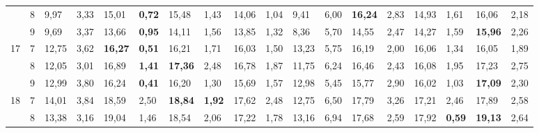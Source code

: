 \documentclass[conference]{IEEEtran}
\begin{document}
\begin{table*}[]
\begin{tabular}{|cl|ll|ll|ll|ll|ll|ll|ll|ll|}
		\multicolumn{1}{|c|}{} & 8 & \multicolumn{1}{l|}{9,97} & 3,33 & \multicolumn{1}{l|}{15,01} & \textbf{0,72} & \multicolumn{1}{l|}{15,48} & 1,43 & \multicolumn{1}{l|}{14,06} & 1,04 & \multicolumn{1}{l|}{9,41} & 6,00 & \multicolumn{1}{l|}{\textbf{16,24}} & 2,83 & \multicolumn{1}{l|}{14,93} & 1,61 & \multicolumn{1}{l|}{16,06} & 2,18 \\ \cline{2-18} 
		\multicolumn{1}{|c|}{} & 9 & \multicolumn{1}{l|}{9,69} & 3,37 & \multicolumn{1}{l|}{13,66} & \textbf{0,95} & \multicolumn{1}{l|}{14,11} & 1,56 & \multicolumn{1}{l|}{13,85} & 1,32 & \multicolumn{1}{l|}{8,36} & 5,70 & \multicolumn{1}{l|}{14,55} & 2,47 & \multicolumn{1}{l|}{14,27} & 1,59 & \multicolumn{1}{l|}{\textbf{15,96}} & 2,26 \\ \hline
		\multicolumn{1}{|c|}{\multirow{3}{*}{17}} & 7 & \multicolumn{1}{l|}{12,75} & 3,62 & \multicolumn{1}{l|}{\textbf{16,27}} & \textbf{0,51} & \multicolumn{1}{l|}{16,21} & 1,71 & \multicolumn{1}{l|}{16,03} & 1,50 & \multicolumn{1}{l|}{13,23} & 5,75 & \multicolumn{1}{l|}{16,19} & 2,00 & \multicolumn{1}{l|}{16,06} & 1,34 & \multicolumn{1}{l|}{16,05} & 1,89 \\ \cline{2-18} 
		\multicolumn{1}{|c|}{} & 8 & \multicolumn{1}{l|}{12,05} & 3,01 & \multicolumn{1}{l|}{16,89} & \textbf{1,41} & \multicolumn{1}{l|}{\textbf{17,36}} & 2,48 & \multicolumn{1}{l|}{16,78} & 1,87 & \multicolumn{1}{l|}{11,75} & 6,24 & \multicolumn{1}{l|}{16,46} & 2,43 & \multicolumn{1}{l|}{16,08} & 1,95 & \multicolumn{1}{l|}{17,23} & 2,75 \\ \cline{2-18} 
		\multicolumn{1}{|c|}{} & 9 & \multicolumn{1}{l|}{12,99} & 3,80 & \multicolumn{1}{l|}{16,24} & \textbf{0,41} & \multicolumn{1}{l|}{16,20} & 1,30 & \multicolumn{1}{l|}{15,69} & 1,57 & \multicolumn{1}{l|}{12,98} & 5,45 & \multicolumn{1}{l|}{15,77} & 2,90 & \multicolumn{1}{l|}{16,02} & 1,03 & \multicolumn{1}{l|}{\textbf{17,09}} & 2,30 \\ \hline
		\multicolumn{1}{|c|}{\multirow{3}{*}{18}} & 7 & \multicolumn{1}{l|}{14,01} & 3,84 & \multicolumn{1}{l|}{18,59} & 2,50 & \multicolumn{1}{l|}{\textbf{18,84}} & \textbf{1,92} & \multicolumn{1}{l|}{17,62} & 2,48 & \multicolumn{1}{l|}{12,75} & 6,50 & \multicolumn{1}{l|}{17,79} & 3,26 & \multicolumn{1}{l|}{17,21} & 2,46 & \multicolumn{1}{l|}{17,89} & 2,58 \\ \cline{2-18} 
		\multicolumn{1}{|c|}{} & 8 & \multicolumn{1}{l|}{13,38} & 3,16 & \multicolumn{1}{l|}{19,04} & 1,46 & \multicolumn{1}{l|}{18,54} & 2,06 & \multicolumn{1}{l|}{17,22} & 1,78 & \multicolumn{1}{l|}{13,16} & 6,94 & \multicolumn{1}{l|}{17,68} & 2,59 & \multicolumn{1}{l|}{17,92} & \textbf{0,59} & \multicolumn{1}{l|}{\textbf{19,13}} & 2,64 \\ \cline{2-18} 

\end{tabular}
\end{table*}
\end{document}
